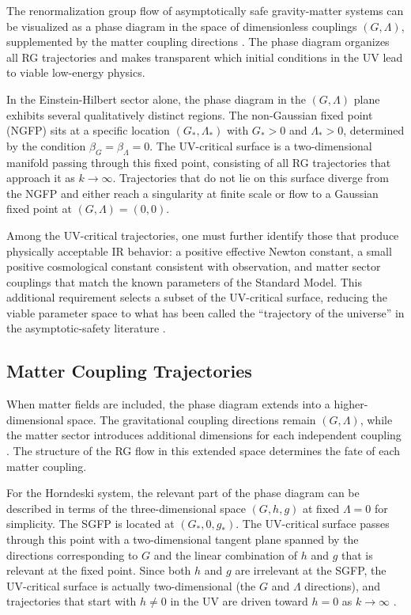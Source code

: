 \documentclass[12pt,a4paper]{article}
\begin{document}
The renormalization group flow of asymptotically safe gravity-matter systems
can be visualized as a phase diagram in the space of dimensionless couplings
$(G, \Lambda)$, supplemented by the matter coupling directions
\cite{ReuterSaueressig2012,Percacci2017,Eichhorn2019}. The phase diagram
organizes all RG trajectories and makes transparent which initial conditions
in the UV lead to viable low-energy physics.

In the Einstein-Hilbert sector alone, the phase diagram in the $(G, \Lambda)$
plane exhibits several qualitatively distinct regions. The non-Gaussian fixed
point (NGFP) sits at a specific location $(G_*, \Lambda_*)$ with $G_* > 0$ and
$\Lambda_* > 0$, determined by the condition $\beta_G = \beta_\Lambda = 0$. The
UV-critical surface is a two-dimensional manifold passing through this fixed
point, consisting of all RG trajectories that approach it as $k \to \infty$.
Trajectories that do not lie on this surface diverge from the NGFP and either
reach a singularity at finite scale or flow to a Gaussian fixed point at
$(G, \Lambda) = (0, 0)$.

Among the UV-critical trajectories, one must further identify those that
produce physically acceptable IR behavior: a positive effective Newton constant,
a small positive cosmological constant consistent with observation, and
matter sector couplings that match the known parameters of the Standard Model.
This additional requirement selects a subset of the UV-critical surface,
reducing the viable parameter space to what has been called the ``trajectory
of the universe'' in the asymptotic-safety literature \cite{ReuterSaueressig2012,
Bonanno2002}.

\subsection{Matter Coupling Trajectories}

When matter fields are included, the phase diagram extends into a higher-dimensional
space. The gravitational coupling directions remain $(G, \Lambda)$, while the
matter sector introduces additional dimensions for each independent coupling
\cite{Eichhorn2019,EichhornSchiffer2022handbook}. The structure of the RG flow
in this extended space determines the fate of each matter coupling.

For the Horndeski system, the relevant part of the phase diagram can be
described in terms of the three-dimensional space $(G, h, g)$ at fixed
$\Lambda = 0$ for simplicity. The SGFP is located at $(G_*, 0, g_*)$. The
UV-critical surface passes through this point with a two-dimensional tangent
plane spanned by the directions corresponding to $G$ and the linear combination
of $h$ and $g$ that is relevant at the fixed point. Since both $h$ and $g$ are
irrelevant at the SGFP, the UV-critical surface is actually two-dimensional (the
$G$ and $\Lambda$ directions), and trajectories that start with $h \neq 0$ in the
UV are driven toward $h = 0$ as $k \to \infty$ \cite{EichhornLinoWagner2023}.
\end{document}
